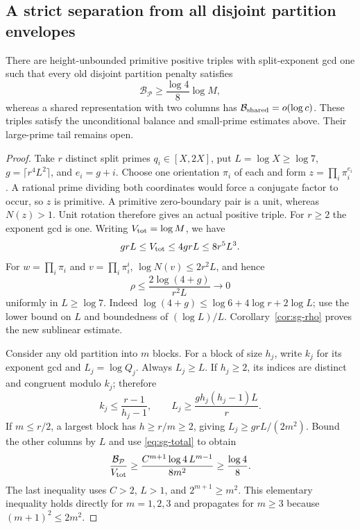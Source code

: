 \subsection{A strict separation from all disjoint partition envelopes}
\begin{theorem}\label{thm:sg-strict-separation}
There are height-unbounded primitive positive triples with split-exponent gcd
one such that every old disjoint partition penalty satisfies
\[
 \mathcal B_{\mathcal P}\ge\frac{\log4}{8}\log M,
\]
whereas a shared representation with two columns has
$\mathcal B_{\rm shared}=o(\log c)$. These triples satisfy the unconditional
balance and small-prime estimates above. Their large-prime tail remains open.
\end{theorem}
\begin{proof}
Take $r$ distinct split primes $q_i\in[X,2X]$, put $L=\log X\ge\log7$,
$g=\lceil r^4L^2\rceil$, and $e_i=g+i$. Choose one orientation $\pi_i$ of
each and form $z=\prod_i\pi_i^{e_i}$. A rational prime dividing both
coordinates would force a conjugate factor to occur, so $z$ is primitive.
A primitive zero-boundary pair is a unit, whereas $N(z)>1$. Unit rotation
therefore gives an actual positive triple. For $r\ge2$ the exponent gcd is one.
Writing $V_{\rm tot}=\log M$, we have
\begin{equation}\label{eq:sg-total}
 grL\le V_{\rm tot}\le4grL\le8r^5L^3.
\end{equation}
For $w=\prod_i\pi_i$ and $v=\prod_i\pi_i^i$,
$\log N(v)\le2r^2L$, and hence
\[
 \rho\le\frac{2\log(4+g)}{r^2L}\longrightarrow0
\]
uniformly in $L\ge\log7$. Indeed
$\log(4+g)\le\log6+4\log r+2\log L$; use the lower bound on $L$ and
boundedness of $(\log L)/L$. Corollary~\ref{cor:sg-rho} proves the new
sublinear estimate.

Consider any old partition into $m$ blocks. For a block of size $h_j$, write
$k_j$ for its exponent gcd and $L_j=\log Q_j$. Always $L_j\ge L$.
If $h_j\ge2$, its indices are distinct and congruent modulo $k_j$; therefore
\[
 k_j\le\frac{r-1}{h_j-1},\qquad
 L_j\ge\frac{g h_j(h_j-1)L}{r}.
\]
If $m\le r/2$, a largest block has $h\ge r/m\ge2$, giving
$L_j\ge grL/(2m^2)$. Bound the other columns by $L$ and use
\eqref{eq:sg-total} to obtain
\[
 \frac{\mathcal B_{\mathcal P}}{V_{\rm tot}}
 \ge\frac{C^{m+1}\log4\,L^{m-1}}{8m^2}\ge\frac{\log4}{8}.
\]
The last inequality uses $C>2$, $L>1$, and $2^{m+1}\ge m^2$. This elementary
inequality holds directly for $m=1,2,3$ and propagates for $m\ge3$ because
$(m+1)^2\le2m^2$.


\end{proof}
